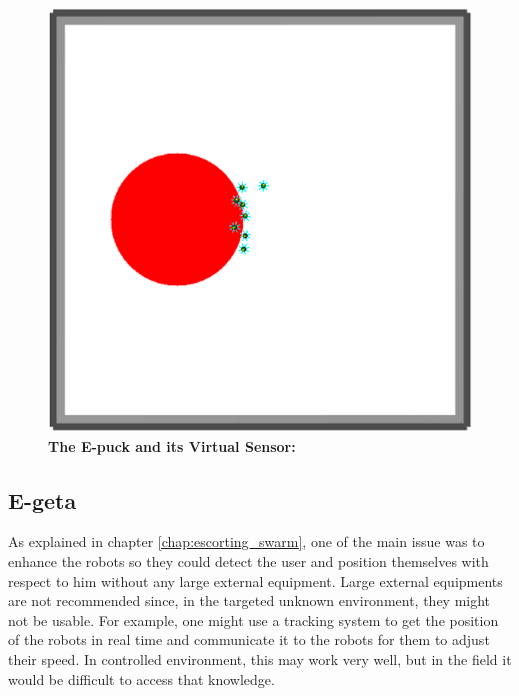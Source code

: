 \documentclass[oneside, a4paper, 12pt]{memoir}
\let\oldCaption\caption
\renewcommand{\caption}[2]{
\oldCaption[#1]{{\small\sffamily\bfseries #1:} #2}
}
\begin{document}
		\begin{figure}[!h]
			\begin{minipage}[c]{0.49\textwidth}
				\includegraphics[width=\textwidth]{../Experiments/No_Human/red_circle.png}			
			\end{minipage}
			
			\caption{The E-puck and its Virtual Sensor}{}
			\label{fig:e-puck_red_zones}
		\end{figure}
		
		\subsection{E-geta} %

		
	As explained in chapter \ref{chap:escorting_swarm}, one of the main issue was to enhance the robots so they could detect the user and position themselves with respect to him without any large external equipment. Large external equipments are not recommended since, in the targeted unknown environment, they might not be usable. For example, one might use a tracking system to get the position of the robots in real time and communicate it to the robots for them to adjust their speed. In controlled environment, this may work very well, but in the field it would be difficult to access that knowledge.\\
	
\end{document}
